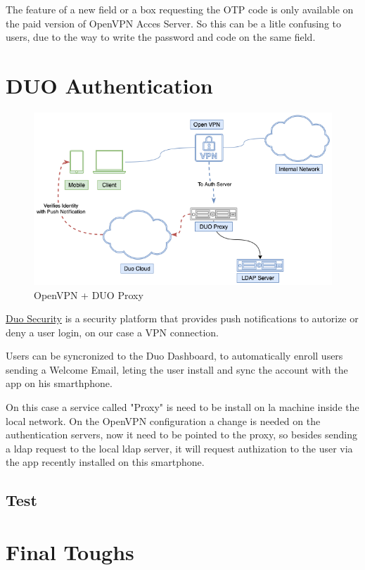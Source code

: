 The feature of a new field or a box requesting the OTP code is only available on the paid version of OpenVPN Acces Server.
So this can be a litle confusing to users, due to the way to write the password and code on the same field.




\newpage
\section{DUO Authentication}

\begin{figure}[!h]
  \centering
  \includegraphics[width=160mm]{images/DUO-Proxy.drawio.png}
  \caption{OpenVPN + DUO Proxy}
  \label{fig:label}
\end{figure}

\href{https://duo.com/}{Duo Security} is a security platform that provides push notifications to autorize or deny a user login, on our case a VPN connection.

Users can be syncronized to the Duo Dashboard, to automatically enroll users sending a Welcome Email, leting the user install and sync the account with the app on his smarthphone.

On this case a service called "Proxy" is need to be install on la machine inside the local network. On the OpenVPN configuration a change is needed on the authentication servers, now it need to be pointed to the proxy, so besides sending a ldap request to the local ldap server, it will request authization to the user via the app recently installed on this smartphone.



\subsection{Test}


\newpage
\section{Final Toughs}
